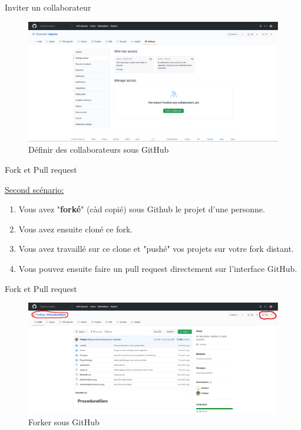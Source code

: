 \documentclass{beamer}
\begin{document}
\begin{frame}{Inviter un collaborateur}

\begin{center}
\begin{figure}[h!]
    \includegraphics[scale=0.15]{images/droits_push/collaborator.png}
    \caption{Définir des collaborateurs sous GitHub}
\end{figure}
\end{center}

\end{frame}

\begin{frame}{Fork et Pull request}

\underline{Second scénario:}\\
\smallskip

\begin{enumerate}
    \item Vous avez "\textbf{forké}" (càd copié) sous Github le projet d'une personne.
    \item Vous avez ensuite cloné ce fork.
    \item Vous avez travaillé sur ce clone et "pushé" vos projets sur votre fork distant.
    \item Vous pouvez ensuite faire un pull request directement sur l'interface GitHub.
\end{enumerate}

\normalsize
\end{frame}

\begin{frame}{Fork et Pull request}
\begin{figure}[h!]
    \includegraphics[scale=0.15]{images/droits_push/fork.png}
    \caption{Forker sous GitHub}
\end{figure}
\end{frame}
\end{document}
